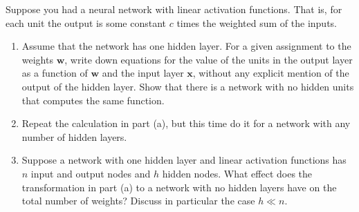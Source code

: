 \documentclass[cn,12pt]{homework}
\begin{document}
\begin{problem}
Suppose you had a neural network with linear activation functions. That is, for each unit the output is some constant $c$ times the weighted sum of the inputs.

\begin{enumerate}[label=\alph*.]
    \item Assume that the network has one hidden layer. For a given assignment to the weights $\mathbf{w}$, write down equations for the value of the units in the output layer as a function of $\mathbf{w}$ and the input layer $\mathbf{x}$, without any explicit mention of the output of the hidden layer. Show that there is a network with no hidden units that computes the same function.
    \item Repeat the calculation in part (a), but this time do it for a network with any number of hidden layers.
    \item Suppose a network with one hidden layer and linear activation functions has $n$ input and output nodes and $h$ hidden nodes. What effect does the transformation in part (a) to a network with no hidden layers have on the total number of weights? Discuss in particular the case $h \ll n$.
\end{enumerate}

\end{problem}
\end{document}

